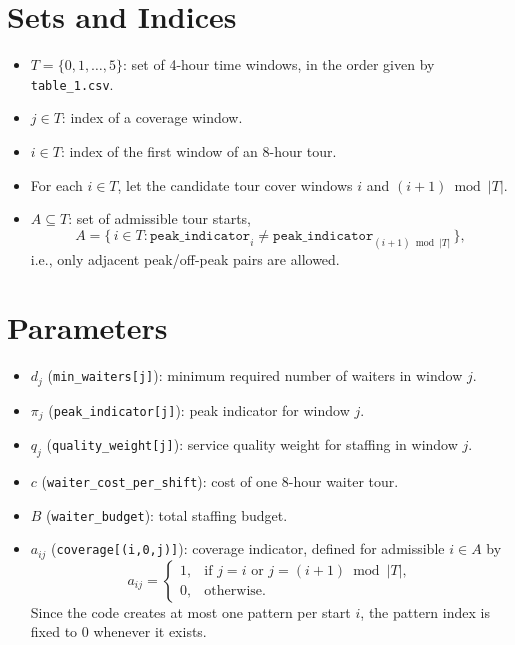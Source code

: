 \section*{Sets and Indices}

\begin{itemize}
    \item $T=\{0,1,\dots,5\}$: set of 4-hour time windows, in the order given by \texttt{table\_1.csv}.
    \item $j \in T$: index of a coverage window.
    \item $i \in T$: index of the first window of an 8-hour tour.
    \item For each $i \in T$, let the candidate tour cover windows $i$ and $(i+1)\bmod |T|$.
    \item $A \subseteq T$: set of admissible tour starts,
    \[
        A=\{\, i \in T : \texttt{peak\_indicator}_i \neq \texttt{peak\_indicator}_{(i+1)\bmod |T|}\,\},
    \]
    i.e., only adjacent peak/off-peak pairs are allowed.
\end{itemize}

\section*{Parameters}

\begin{itemize}
    \item $d_j$ (\texttt{min\_waiters[j]}): minimum required number of waiters in window $j$.
    \item $\pi_j$ (\texttt{peak\_indicator[j]}): peak indicator for window $j$.
    \item $q_j$ (\texttt{quality\_weight[j]}): service quality weight for staffing in window $j$.
    \item $c$ (\texttt{waiter\_cost\_per\_shift}): cost of one 8-hour waiter tour.
    \item $B$ (\texttt{waiter\_budget}): total staffing budget.
    \item $a_{ij}$ (\texttt{coverage[(i,0,j)]}): coverage indicator, defined for admissible $i \in A$ by
    \[
        a_{ij}=
        \begin{cases}
            1, & \text{if } j=i \text{ or } j=(i+1)\bmod |T|,\\
            0, & \text{otherwise}.
        \end{cases}
    \]
    Since the code creates at most one pattern per start $i$, the pattern index is fixed to $0$ whenever it exists.
\end{itemize}

